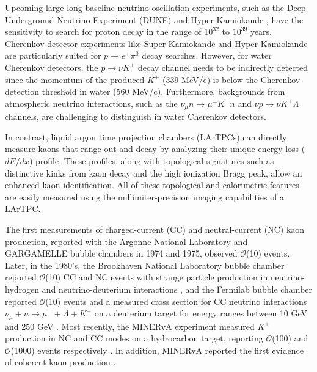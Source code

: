 \documentclass[aps,prd,longbibliography,twocolumn,showpacs,superscriptaddress,floatfix,10pt]{revtex4-1}
\begin{document}
Upcoming large long-baseline neutrino oscillation experiments, such as the Deep Underground Neutrino Experiment (DUNE) \cite{dunetdr} and Hyper-Kamiokande \cite{protocollaboration2018hyperkamiokandedesignreport}, have the sensitivity to search for proton decay in the range of $10^{32}$ to $10^{39}$ years. Cherenkov detector experiments like Super-Kamiokande \cite{PhysRevD.90.072005, PhysRevD.95.012004, PhysRevD.102.112011} and Hyper-Kamiokande are particularly suited for $p \rightarrow e^{+} \pi^{0}$ decay searches. However, for water Cherenkov detectors, the $p \rightarrow \nu K^{+}$ decay channel needs to be indirectly detected since the momentum of the produced $K^{+}$ (339 MeV/c) is below the Cherenkov detection threshold in water (560 MeV/c). Furthermore, backgrounds from atmospheric neutrino interactions, such as the $ \nu_\mu n \rightarrow \mu^- K^+ n $ and $ \nu p \rightarrow \nu K^+ \Lambda $ channels, are challenging to distinguish in water Cherenkov detectors.

In contrast, liquid argon time projection chambers (LArTPCs) can directly measure 
kaons that range out and decay by analyzing their unique energy loss ($dE/dx$) profile. These profiles, along with topological signatures such as distinctive kinks from kaon decay and the high ionization Bragg peak, allow an enhanced kaon identification. All of these topological and calorimetric features are easily measured using the millimiter-precision imaging capabilities of a LArTPC. 

The first measurements of charged-current (CC) and neutral-current (NC) kaon production, reported with the Argonne National Laboratory \cite{PhysRevLett.33.1446} and GARGAMELLE bubble chambers \cite{osti_4109186} in 1974 and 1975, observed $\mathcal{O}$(10) events. Later, in the 1980's, the Brookhaven National Laboratory bubble chamber reported $\mathcal{O}$(10) CC and NC events with strange particle production in neutrino-hydrogen and neutrino-deuterium interactions \cite{Jensen:1964zz, PhysRevD.24.2779}, and the Fermilab bubble chamber reported $\mathcal{O}$(10) events and a measured cross section for CC neutrino interactions $\nu_\mu + n \xrightarrow{} \mu^- + \Lambda + K^+$ on a deuterium target for energy ranges between 10 GeV and 250 GeV \cite{PhysRevD.28.2129}. Most recently, the MINERvA experiment measured $K^+$ production in NC and CC modes on a hydrocarbon target, reporting $\mathcal{O}$(100) and $\mathcal{O}$(1000) events respectively \cite{PhysRevD.94.012002, PhysRevLett.119.011802, Marshall:2016mar}. In addition, MINERvA reported the first evidence of coherent kaon production \cite{PhysRevLett.117.061802, Marshall:2016mar}.
\end{document}
